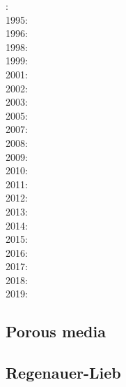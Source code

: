 {\scriptsize
{}: \cite{rich94}\cite{fari94}\\
1995: \cite{whmc95}\\
1996: \cite{zhgm96}\\
1998: \cite{bisp98}\cite{most98}\\
1999: \cite{most99}\cite{shet99}\\
2001: \cite{vapy01}\\
2002: \cite{foul02}\\
2003: \cite{vazh03}\\
2005: \cite{bugu05}\cite{fasa05}\\
2007: \cite{stco07}\\
2008: \cite{uegs08}\cite{slee08}\\
2009: \cite{bucl09}\cite{zhgy09}\cite{baiv10}\cite{tabs09}\cite{maml09}\\
2010: \cite{fabl10}\\
2011: \cite{sosk11}\cite{vasd11}\\
2012: \cite{huco12}\\
2013: \cite{bemm12}\cite{brps13}\\
2014: \cite{buge14}\cite{gery14b}\cite{buto14}\cite{buit14}\cite{leli14}\\
2015: \cite{bemm15}\cite{gesb15}\cite{kocb15}\cite{meds15}\cite{lile15}\\
2016: \cite{fige16}\cite{gadb16}\cite{kobc16}\\
2017: \cite{bahf17}\cite{brsg17}\cite{bahf17}\cite{bekb17}\cite{kocb17}\\
2018: \cite{daga18}\\
2019: \cite{kobg19}
}

\subsection{Porous media} 

{\scriptsize
\noindent
\cite{scst86}
\cite{scot88}
\cite{spie93}
\cite{scth00b}
\cite{dyge13}
}

\subsection{Regenauer-Lieb}

